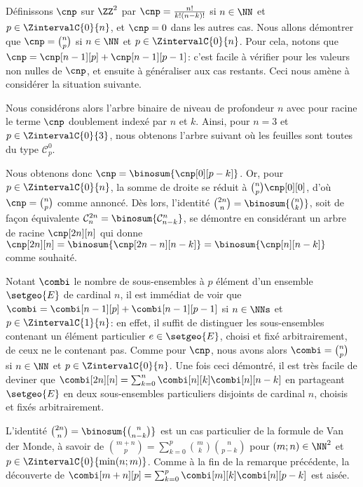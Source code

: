 Définissons $\cnp$ sur $\ZZ^2$ par
$\cnp = \frac{n!}{k!(n-k)!}$ si $n \in \NN$ et $p \in \ZintervalC{0}{n}$,
et
$\cnp = 0$ dans les autres cas.
%
Nous allons démontrer que $\cnp = \binom{n}{p}$ si $n \in \NN$ et $p \in \ZintervalC{0}{n}$.
%
Pour cela, notons que $\cnp = \cnp[n-1][p] + \cnp[n-1][p-1]$:
c'est facile à vérifier pour les valeurs non nulles de $\cnp$, et ensuite à généraliser aux cas restants.
Ceci nous amène à considérer la situation suivante.

\explaintree{\cnp}{\cnp[n-1][p]}{\cnp[n-1][p-1]}%
            {\factobinomintertree}{}

Nous considérons alors l'arbre binaire de niveau de profondeur $n$ avec pour racine le terme $\cnp$ doublement indexé par $n$ et $k$.
Ainsi, pour $n=3$ et $p \in \ZintervalC{0}{3}$, nous obtenons l'arbre suivant où les feuilles sont toutes du type $\mathcal{C}^0_p$.


Nous obtenons donc
$\cnp = \binosum{\cnp[0][p-k]}$.
Or, pour $p \in \ZintervalC{0}{n}$, la somme de droite se réduit à $\binom{n}{p} \cnp[0][0]$, d'où $\cnp = \binom{n}{p}$ comme annoncé.
%
Dès lors, l'identité
$\binom{2n}{n} = \binosum{\binom{n}{k}}$,
soit de façon équivalente
$\mathcal{C}^{2n}_n = \binosum{\mathcal{C}^n_{n-k}}$,
se démontre en considérant un arbre de racine $\cnp[2n][n]$ qui donne
$\cnp[2n][n] = \binosum{\cnp[2n - n][n-k]} = \binosum{\cnp[n][n-k]}$
comme souhaité.


\begin{remark}
	Notant $\combi$ le nombre de sous-ensembles à $p$ élément d'un ensemble $\setgeo{E}$ de cardinal $n$, il est immédiat de voir que
	$\combi = \combi[n-1][p] + \combi[n-1][p-1]$ si $n \in \NNs$ et $p \in \ZintervalC{1}{n}$:
	en effet, il suffit de distinguer les sous-ensembles contenant un élément particulier $e \in \setgeo{E}$, choisi et fixé arbitrairement, de ceux ne le contenant pas.
	Comme pour $\cnp$, nous avons alors $\combi = \binom{n}{p}$ si $n \in \NN$ et $p \in \ZintervalC{0}{n}$.
	Une fois ceci démontré, il est très facile de deviner que 
	$\combi[2n][n] = \sum_{k=0}^{n} \combi[n][k] \combi[n][n-k]$
	en partageant $\setgeo{E}$ en deux sous-ensembles particuliers disjoints de cardinal $n$, choisis et fixés arbitrairement.
\end{remark}


\begin{remark}
	L'identité 
	$\binom{2n}{n} = \binosum{\binom{n}{n-k}}$
	est un cas particulier de la formule de Van der Monde, à savoir de
	$\binom{m + n}{p} = \sum_{k=0}^p \binom{m}{k} \binom{n}{p-k}$
	pour $(m ; n) \in \NN^2$ et $p \in \ZintervalC{0}{\min(n ; m)}$.
	Comme à la fin de la remarque précédente, la découverte de
	$\combi[m + n][p] = \sum_{k=0}^p \combi[m][k] \combi[n][p-k]$
	est aisée. 
\end{remark}




